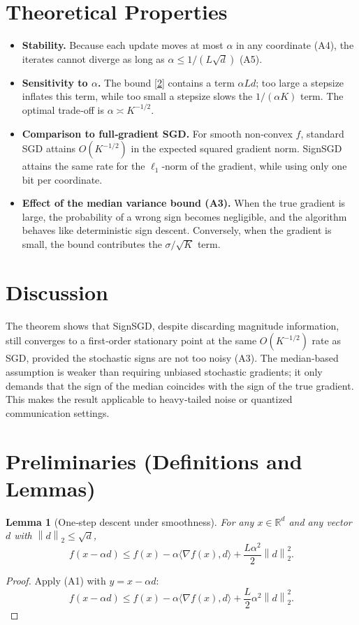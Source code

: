 \documentclass{article}
\newtheorem{lemma}{Lemma}
\newcommand{\norm}[1]{\left\|#1\right\|}
\newcommand{\ip}[2]{\langle #1,#2\rangle}
\begin{document}
\section*{Theoretical Properties}
\begin{itemize}
\item \textbf{Stability.} Because each update moves at most $\alpha$ in any coordinate (A4), the iterates cannot diverge as long as $\alpha\le 1/(L\sqrt d)$ (A5).
\item \textbf{Sensitivity to $\alpha$.} The bound \eqref{2} contains a term $\alpha L d$; too large a stepsize inflates this term, while too small a stepsize slows the $1/(\alpha K)$ term. The optimal trade‑off is $\alpha\asymp K^{-1/2}$.
\item \textbf{Comparison to full‑gradient SGD.} For smooth non‑convex $f$, standard SGD attains $O(K^{-1/2})$ in the expected squared gradient norm. SignSGD attains the same rate for the $\ell_1$‑norm of the gradient, while using only one bit per coordinate.
\item \textbf{Effect of the median variance bound (A3).} When the true gradient is large, the probability of a wrong sign becomes negligible, and the algorithm behaves like deterministic sign descent. Conversely, when the gradient is small, the bound contributes the $\sigma/\sqrt{K}$ term.
\end{itemize}

\section*{Discussion}
The theorem shows that SignSGD, despite discarding magnitude information, still converges to a first‑order stationary point at the same $O(K^{-1/2})$ rate as SGD, provided the stochastic signs are not too noisy (A3). The median‑based assumption is weaker than requiring unbiased stochastic gradients; it only demands that the sign of the median coincides with the sign of the true gradient. This makes the result applicable to heavy‑tailed noise or quantized communication settings.

\section*{Preliminaries (Definitions and Lemmas)}
\begin{lemma}[One‑step descent under smoothness]\label{lem:descent}
For any $x\in\mathbb{R}^d$ and any vector $d$ with $\norm{d}_2\le\sqrt d$,
\[
f(x-\alpha d)\le f(x)-\alpha\ip{\nabla f(x)}{d}+\frac{L\alpha^2}{2}\norm{d}_2^2 .
\tag{3}
\]
\end{lemma}
\begin{proof}
Apply (A1) with $y=x-\alpha d$:
\[
f(x-\alpha d)\le f(x)-\alpha\ip{\nabla f(x)}{d}+\frac{L}{2}\alpha^2\norm{d}_2^2 .
\]
\end{proof}
\end{document}
